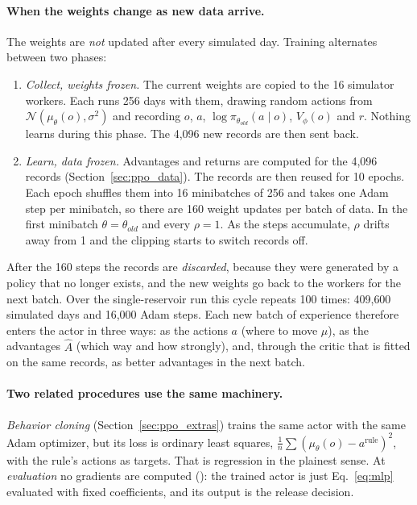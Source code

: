 \paragraph{When the weights change as new data arrive.}
The weights are \emph{not} updated after every simulated day. Training
alternates between two phases:
\begin{enumerate}\itemsep2pt
\item \emph{Collect, weights frozen.} The current weights are copied to
  the 16 simulator workers. Each runs 256 days with them, drawing random
  actions from $\mathcal N(\mu_\theta(o),\sigma^2)$ and recording $o$, $a$,
  $\log\pi_{\theta_{old}}(a\mid o)$, $V_\phi(o)$ and $r$. Nothing learns
  during this phase. The 4{,}096 new records are then sent back.
\item \emph{Learn, data frozen.} Advantages and returns are computed for the
  4{,}096 records (Section~\ref{sec:ppo_data}). The records are then
  reused for 10 epochs. Each epoch shuffles them into 16 minibatches of 256
  and takes one Adam step per minibatch, so there are 160 weight updates
  per batch of data. In the first minibatch $\theta=\theta_{old}$ and every
  $\rho=1$. As the steps accumulate, $\rho$ drifts away from 1 and the
  clipping starts to switch records off.
\end{enumerate}
After the 160 steps the records are \emph{discarded}, because they were
generated by a policy that no longer exists, and the new weights go back
to the workers for the next batch. Over the single-reservoir run this
cycle repeats 100 times: 409{,}600 simulated days and 16{,}000 Adam steps.
Each new batch of experience therefore enters the actor in three ways: as
the actions $a$ (where to move $\mu$), as the advantages $\hat A$ (which
way and how strongly), and, through the critic that is fitted on the same
records, as better advantages in the next batch.

\paragraph{Two related procedures use the same machinery.}
\emph{Behavior cloning} (Section~\ref{sec:ppo_extras}) trains the same
actor with the same Adam optimizer, but its loss is ordinary least
squares, $\frac1n\sum(\mu_\theta(o)-a^{\mathrm{rule}})^2$, with the rule's
actions as targets. That is regression in the plainest sense. At
\emph{evaluation} no gradients are computed ():
the trained actor is just Eq.~\eqref{eq:mlp} evaluated with fixed
coefficients, and its output is the release decision.
